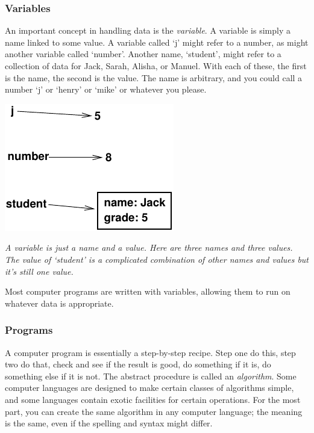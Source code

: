 \documentclass[11pt]{article}
\newcommand{\new}[1]{\index{#1}\emph{#1}}
\newcommand{\capt}[1]{\begin{minipage}{0.75\columnwidth}\itshape#1\end{minipage}}
\begin{document}
\subsubsection{Variables}

An important concept in handling data is the \emph{variable}.  A
variable is simply a name linked to some value.  A variable called `j'
might refer to a number, as might another variable called `number'.
Another name, `student', might refer to a collection of data for Jack,
Sarah, Alisha, or Manuel.  With each of these, the first is the name,
the second is the value.  The name is arbitrary, and you could call a
number `j' or `henry' or `mike' or whatever you please.

\begin{center}
\includegraphics{variables.pdf}

\capt{A variable is just a name and a value.  Here are three names and
  three values.  The value of `student' is a complicated combination
  of other names and values but it's still one value.}
\end{center}

Most computer programs are written with variables, allowing them to
run on whatever data is appropriate.


\subsubsection{Programs}


A computer program is essentially a step-by-step recipe.  Step one do
this, step two do that, check and see if the result is good, do
something if it is, do something else if it is not.  The abstract
procedure is called an \new{algorithm}.  Some computer languages are
designed to make certain classes of algorithms simple, and some
languages contain exotic facilities for certain operations. For the
most part, you can create the same algorithm in any computer language;
the meaning is the same, even if the spelling and syntax might differ.
\end{document}
